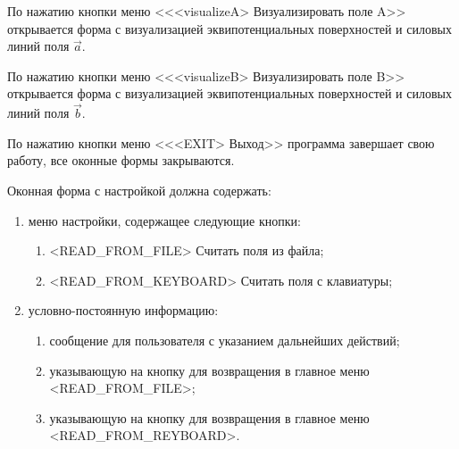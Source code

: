 \documentclass[14pt,a4paper,final]{extreport}
\begin{document}
По нажатию кнопки меню <<<visualizeA> Визуализировать поле A>> открывается форма с визуализацией эквипотенциальных поверхностей и силовых линий поля \( \vec a \).

По нажатию кнопки меню <<<visualizeB> Визуализировать поле B>> открывается форма с визуализацией эквипотенциальных поверхностей и силовых линий поля \( \vec b \).

По нажатию кнопки меню <<<EXIT> Выход>> программа завершает свою работу, все оконные формы закрываются.


Оконная форма с настройкой должна содержать:
\begin{enumerate}[label=\arabic*.,ref=\arabic*]
	\item меню настройки, содержащее следующие кнопки:
		\begin{enumerate}[label=\asbuk*)]
			\item <READ\_FROM\_FILE> Считать поля из файла;
			\item <READ\_FROM\_KEYBOARD> Считать поля с клавиатуры;
		\end{enumerate}
	\item условно-постоянную информацию:
		\begin{enumerate}[label=\asbuk*)]
			\item сообщение для пользователя с указанием дальнейших действий;

\pagebreak %

			\item указывающую на кнопку для возвращения в главное меню <READ\_FROM\_FILE>;
			\item указывающую на кнопку для возвращения в главное меню <READ\_FROM\_REYBOARD>.
		\end{enumerate}
\end{enumerate}

\end{document}
